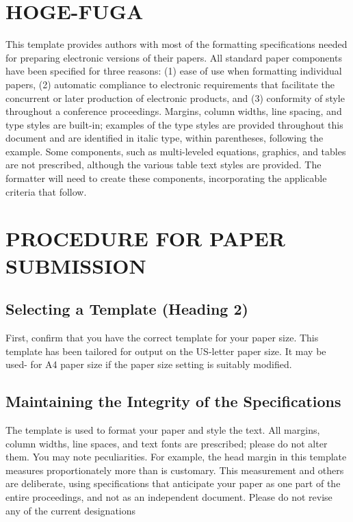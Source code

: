 \documentclass[letterpaper, 10 pt, conference]{ieeeconf}  %
\begin{document}
\section{HOGE-FUGA}
This template provides authors with most of the formatting specifications needed for preparing electronic versions of their papers. All standard paper components have been specified for three reasons: (1) ease of use when formatting individual papers, (2) automatic compliance to electronic requirements that facilitate the concurrent or later production of electronic products, and (3) conformity of style throughout a conference proceedings. Margins, column widths, line spacing, and type styles are built-in; examples of the type styles are provided throughout this document and are identified in italic type, within parentheses, following the example. Some components, such as multi-leveled equations, graphics, and tables are not prescribed, although the various table text styles are provided. The formatter will need to create these components, incorporating the applicable criteria that follow.

\section{PROCEDURE FOR PAPER SUBMISSION}

\subsection{Selecting a Template (Heading 2)}

First, confirm that you have the correct template for your paper size. This template has been tailored for output on the US-letter paper size. 
It may be used- for A4 paper size if the paper size setting is suitably modified.

\subsection{Maintaining the Integrity of the Specifications}

The template is used to format your paper and style the text. All margins, column widths, line spaces, and text fonts are prescribed; please do not alter them. You may note peculiarities. For example, the head margin in this template measures proportionately more than is customary. This measurement and others are deliberate, using specifications that anticipate your paper as one part of the entire proceedings, and not as an independent document. Please do not revise any of the current designations
\end{document}

